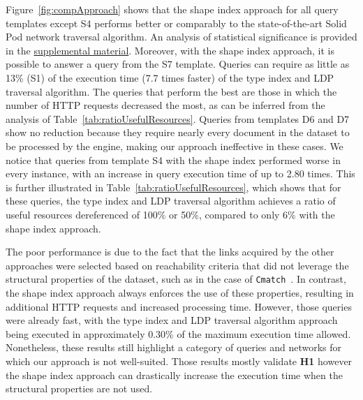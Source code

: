 Figure~\ref{fig:compApproach} shows that the shape index approach for all query templates except S4 performs better or comparably to the state-of-the-art Solid Pod network traversal algorithm.
An analysis of statistical significance is provided in the \hyperref[sec:supplementalMaterial]{supplemental material}.
Moreover, with the shape index approach, it is possible to answer a query from the S7 template.
Queries can require as little as 13\% (S1) of the execution time (7.7 times faster) of the type index and LDP traversal algorithm.
The queries that perform the best are those in which the number of HTTP requests decreased the most, as can be inferred from the analysis of Table~\ref{tab:ratioUsefulResources}.
Queries from templates D6 and D7 show no reduction because they require nearly every document in the dataset to be processed by the engine, making our approach ineffective in these cases.
We notice that queries from template S4 with the shape index performed worse in every instance, with an increase in query execution time of up to 2.80 times.
This is further illustrated in Table~\ref{tab:ratioUsefulResources}, which shows that for these queries, the type index and LDP traversal algorithm achieves a ratio of useful resources dereferenced of 100\% or 50\%, compared to only 6\% with the shape index approach.

The poor performance is due to the fact that the links acquired by the other approaches were selected based on reachability criteria that did not leverage the structural properties of the dataset, such as in the case of \texttt{Cmatch}~\cite{hartig2016walking}.
In contrast, the shape index approach always enforces the use of these properties, resulting in additional HTTP requests and increased processing time.
However, those queries were already fast, with the type index and LDP traversal algorithm approach being executed in approximately 0.30\% of the maximum execution time allowed.
Nonetheless, these results still highlight a category of queries and networks for which our approach is not well-suited.
Those results mostly validate \textbf{H1} however the shape index approach can drastically increase the execution time when the structural properties are not used.

